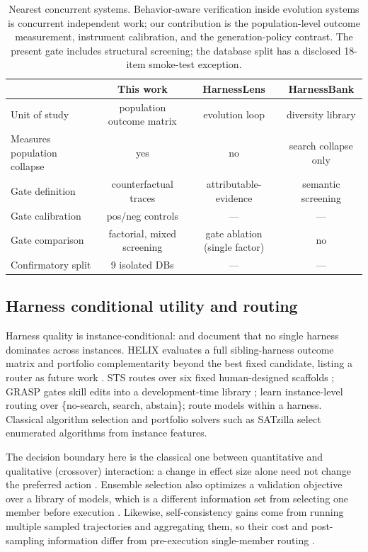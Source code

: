 \begin{table}[t]
\centering
\footnotesize
\setlength{\tabcolsep}{3pt}
\begin{tabular}{@{}lccc@{}}
\toprule
 & \textbf{This work} & \textbf{HarnessLens} & \textbf{HarnessBank} \\
\midrule
Unit of study & population outcome matrix & evolution loop & diversity library \\
Measures population collapse & yes & no & search collapse only \\
Gate definition & counterfactual traces & attributable-evidence & semantic screening \\
Gate calibration & pos/neg controls & --- & --- \\
Gate comparison & factorial, mixed screening & gate ablation (single factor) & no \\
Confirmatory split & 9 isolated DBs & --- & --- \\
\bottomrule
\end{tabular}
\caption{Nearest concurrent systems. Behavior-aware verification inside
evolution systems is concurrent independent work; our contribution is the
population-level outcome measurement, instrument calibration, and the
generation-policy contrast. The present gate includes structural screening; the database split has a
disclosed 18-item smoke-test exception.}
\label{tab:nearest}
\end{table}

\subsection{Harness conditional utility and routing}\label{related:routing}
Harness quality is instance-conditional: \citet{nouniversal2026} and
\citet{nonmonotone2026} document that no single harness dominates across
instances. HELIX evaluates a full sibling-harness outcome matrix and
portfolio complementarity beyond the best fixed candidate, listing a router
as future work \citep{helix2026}. STS routes over six fixed human-designed
scaffolds \citep{sts2026}; GRASP gates skill edits into a development-time
library \citep{grasp2026}; \citet{cfrouting2026} learn instance-level routing
over \{no-search, search, abstain\}; \citet{agenticrouting2026} route models
within a harness. Classical algorithm selection \citep{rice1976} and
portfolio solvers such as SATzilla \citep{xu2008satzilla,kotthoff2016}
select enumerated algorithms from instance features.

The decision boundary here is the classical one between quantitative and
qualitative (crossover) interaction: a change in effect size alone need not
change the preferred action \citep{gailsimon1985}. Ensemble selection also
optimizes a validation objective over a library of models, which is a
different information set from selecting one member before execution
\citep{caruana2004}. Likewise, self-consistency gains come from running
multiple sampled trajectories and aggregating them, so their cost and
post-sampling information differ from pre-execution single-member routing
\citep{selfconsistency2022}.

